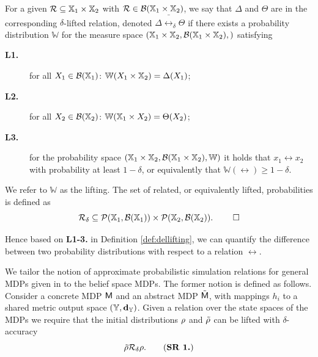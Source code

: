 \documentclass{ifacconf}
\begin{document}
\begin{definition}\label{def:dellifting}
For a given 
	$\mathcal{R}\subseteq {\mathbb{X}}_1\times {\mathbb{X}}_2$ with $\mathcal{R}\in \mathcal B({\mathbb{X}}_1\times {\mathbb{X}}_2)$, we say that  $\Delta$ and $ \Theta$ are in the corresponding $\delta$-lifted relation, denoted $\Delta \bar \rel_\delta \Theta$  if there exists a probability distribution $\mathbb W$ for the measure space $({\mathbb{X}}_1\times {\mathbb{X}}_2,\mathcal B({\mathbb{X}}_1\times {\mathbb{X}}_2),)$
	satisfying { \setlength{\parskip}{-1pt}\setlength{\parsep}{0pt}
		\begin{description}
			\item[\textbf{L1.}] for all $X_1\in \mathcal{B}({\mathbb{X}}_1)$: $\mathbb W(X_1\times {\mathbb{X}}_2)=\Delta(X_1)$;
			\item [\textbf{L2.}] for all $X_2\in \mathcal{B}({\mathbb{X}}_2)$:  $\mathbb W({\mathbb{X}}_1\times X_2)=\Theta(X_2)$;
			\item[\textbf{L3.}] for the probability space  $({\mathbb{X}}_1\times {\mathbb{X}}_2,\mathcal B({\mathbb{X}}_1\times {\mathbb{X}}_2), \mathbb W)$ it holds that
			$x_1\rel x_2$ with probability at least $1-\delta$, or equivalently that $\mathbb{W}\left(\rel\right)\geq1-\delta$.
	\end{description}}%
	
We refer to  $\mathbb W$ as the lifting. %
The set of related, or equivalently lifted, probabilities is defined as 
	\[\bar\rel_\delta\subseteq \mathcal{P}(\X_1,\mathcal B(\X_1))\times \mathcal{P}(\X_2,\mathcal B(\X_2)). \hfill \mbox{ }\qed\] 

\end{definition}

Hence based on \textbf{L1-3.} in Definition \ref{def:dellifting}, we can quantify the difference between two probability distributions with respect to a relation $\rel$.

 
We tailor the   notion of approximate probabilistic simulation relations for general MDPs given in \citep{haesaert2017verification} to the belief space MDPs.
  The former notion is defined as follows. 
Consider a concrete MDP $\mathsf{M}$ and an abstract  MDP $\tilde{\mathsf{M}}$, with mappings $h_i$ to a shared {metric} output space  $({\mathbb{Y}},\mathbf{d}_{\mathbb{Y}})$.  
Given a relation over the state spaces of the MDPs we require that the initial distributions $\rho$ and $\tilde{\rho}$ can be lifted with $\delta$-accuracy
\begin{equation}
\tilde\init \bar \rel_\delta \init.
	\tag{\textbf{SR 1.}}
\end{equation}
  
\end{document}
